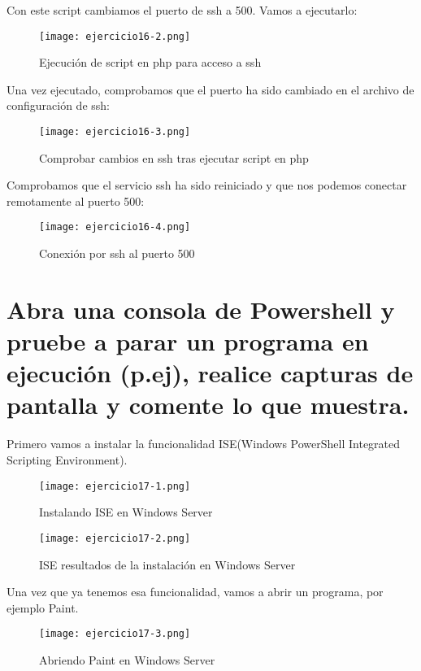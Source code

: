 	Con este script cambiamos el puerto de ssh a 500. Vamos a ejecutarlo:
		\begin{figure}[H]	
			\centering
			\texttt{[image: ejercicio16-2.png]} 
			\label{figura111} 
			\caption{Ejecución de script en php para acceso a ssh}
		\end{figure}
	
	Una vez ejecutado, comprobamos que el puerto ha sido cambiado en el archivo de configuración de ssh:
		\begin{figure}[H]	
			\centering
			\texttt{[image: ejercicio16-3.png]} 
			\label{figura112} 
			\caption{Comprobar cambios en ssh tras ejecutar script en php}
		\end{figure}
	Comprobamos que el servicio ssh ha sido reiniciado y que nos podemos conectar remotamente al puerto 500:
		\begin{figure}[H]	
			\centering
			\texttt{[image: ejercicio16-4.png]} 
			\label{figura113} 
			\caption{Conexión por ssh al puerto 500}
		\end{figure}
	
	
	\section{Abra una consola de Powershell y pruebe a parar un programa en ejecución (p.ej), realice capturas de pantalla y comente lo que muestra.}
	
	Primero vamos a instalar la funcionalidad ISE(Windows PowerShell Integrated Scripting Environment).
	\begin{figure}[H]	
		\centering
		\texttt{[image: ejercicio17-1.png]} 
		\label{figura114} 
		\caption{Instalando ISE en Windows Server}
	\end{figure} 
	\begin{figure}[H]	
		\centering
		\texttt{[image: ejercicio17-2.png]} 
		\label{figura115} 
		\caption{ISE resultados de la instalación en Windows Server}
	\end{figure}
	Una vez que ya tenemos esa funcionalidad, vamos a abrir un programa, por ejemplo Paint.
	\begin{figure}[H]	
		\centering
		\texttt{[image: ejercicio17-3.png]} 
		\label{figura116} 
		\caption{Abriendo Paint en Windows Server}
	\end{figure} 
	
